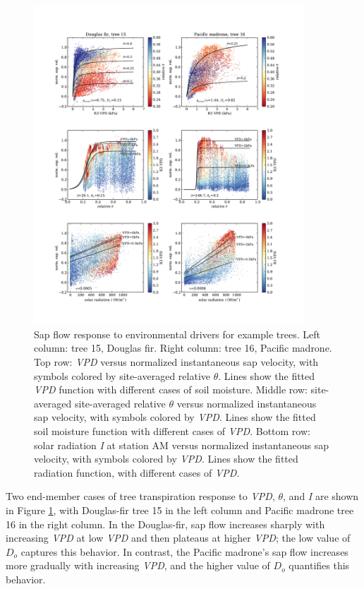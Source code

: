 \begin{figure}[here]
\includegraphics[width=0.9\textwidth]{ch1-sapflow/figures/Figure06.pdf}
\caption{Sap flow response to environmental drivers for example trees.  Left column: tree 15, Douglas fir.  Right column: tree 16, Pacific madrone.  Top row: \textit{VPD} versus normalized instantaneous sap velocity, with symbols colored by site-averaged relative $\theta$.  Lines show the fitted \textit{VPD} function with different cases of soil moisture.  Middle row: site-averaged site-averaged relative $\theta$ versus normalized instantaneous sap velocity, with symbols colored by \textit{VPD}.  Lines show the fitted soil moisture function with different cases of \textit{VPD}.  Bottom row: solar radiation \textit{I} at station AM versus normalized instantaneous sap velocity, with symbols colored by \textit{VPD}.  Lines show the fitted radiation function, with different cases of \textit{VPD}.}
\label{fig:sapflow_scatter}
\end{figure}

Two end-member cases of tree transpiration response to \textit{VPD}, $\theta$, and \textit{I} are shown in Figure \ref{fig:sapflow_scatter}, with Douglas-fir tree 15 in the left column and Pacific madrone tree 16 in the right column.  In the Douglas-fir, sap flow increases sharply with increasing \textit{VPD} at low \textit{VPD} and then plateaus at higher \textit{VPD}; the low value of $D_o$ captures this behavior.  In contrast, the Pacific madrone's sap flow increases more gradually with increasing \textit{VPD}, and the higher value of $D_o$ quantifies this behavior.


